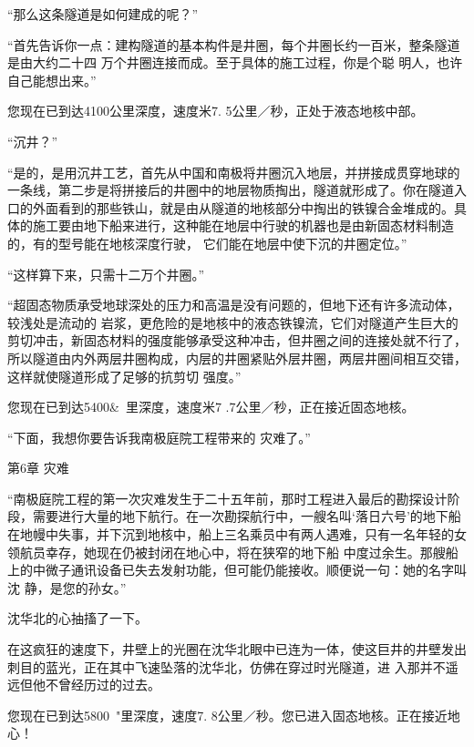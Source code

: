 \documentclass{article}
\begin{document}
“那么这条隧道是如何建成的呢？” 

“首先告诉你一点：建构隧道的基本构件是井圈，每个井圈长约一百米，整条隧道是由大约二十四
\newpage
万个井圈连接而成。至于具体的施工过程，你是个聪
明人，也许自己能想出来。” 

您现在已到达4100公里深度，速度米7.
5公里／秒，正处于液态地核中部。 


“沉井？” 

“是的，是用沉井工艺，首先从中国和南极将井圈沉入地层，并拼接成贯穿地球的一条线，第二步是将拼接后的井圈中的地层物质掏出，隧道就形成了。你在隧道入口的外面看到的那些铁山，就是由从隧道的地核部分中掏出的铁镍合金堆成的。具体的施工要由地下船来进行，这种能在地层中行驶的机器也是由新固态材料制造的，有的型号能在地核深度行驶，
它们能在地层中使下沉的井圈定位。” 


“这样算下来，只需十二万个井圈。” 

“超固态物质承受地球深处的压力和高温是没有问题的，但地下还有许多流动体，较浅处是流动的
\newpage
岩浆，更危险的是地核中的液态铁镍流，它们对隧道产生巨大的剪切冲击，新固态材料的强度能够承受这种冲击，但井圈之间的连接处就不行了，所以隧道由内外两层井圈构成，内层的井圈紧贴外层井圈，两层井圈间相互交错，这样就使隧道形成了足够的抗剪切
强度。” 

您现在已到达5400&~里深度，速度米7
.7公里／秒，正在接近固态地核。 

“下面，我想你要告诉我南极庭院工程带来的
灾难了。” 


第6章 灾难 

“南极庭院工程的第一次灾难发生于二十五年前，那时工程进入最后的勘探设计阶段，需要进行大量的地下航行。在一次勘探航行中，一艘名叫‘落日六号’的地下船在地幔中失事，并下沉到地核中，船上三名乘员中有两人遇难，只有一名年轻的女领航员幸存，她现在仍被封闭在地心中，将在狭窄的地下船
\newpage
中度过余生。那艘船上的中微子通讯设备已失去发射功能，但可能仍能接收。顺便说一句：她的名字叫沈
静，是您的孙女。” 


沈华北的心抽搐了一下。 

在这疯狂的速度下，井壁上的光圈在沈华北眼中已连为一体，使这巨井的井壁发出刺目的蓝光，正在其中飞速坠落的沈华北，仿佛在穿过时光隧道，进
入那并不遥远但他不曾经历过的过去。 

您现在已到达5800~"里深度，速度7.
8公里／秒。您已进入固态地核。正在接近地心！ 
\end{document}
